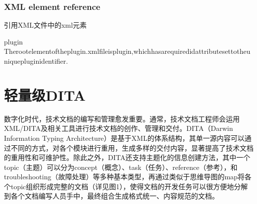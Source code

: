 \documentclass[letterpaper,10pt,english]{sphinxmanual}
\begin{document}
\subsection{XML element reference}
\label{\detokenize{dita-examples/dita-source-reading:xml-element-reference}}
\sphinxAtStartPar
引用XML文件中的xml元素

\sphinxAtStartPar
{}

\begin{sphinxVerbatim}[commandchars=\\\{\}]
plugin
Therootelementoftheplugin.xmlfileisplugin,whichhasarequiredidattributesettotheuniqueplug\PYGZhy{}inidentifier.
\end{sphinxVerbatim}

\sphinxstepscope


\chapter{轻量级DITA}
\label{\detokenize{dita/lightweight-dita:dita}}\label{\detokenize{dita/lightweight-dita::doc}}
\sphinxAtStartPar
数字化时代，技术文档的编写和管理愈发重要。通常，技术文档工程师会运用XML/DITA及相关工具进行技术文档的创作、管理和交付。DITA（Darwin Information Typing Architecture）是基于XML的体系结构，其单一源内容可以通过不同的方式，对各个模块进行重用，生成多样的交付内容，显著提高了技术文档的重用性和可维护性。除此之外，DITA还支持主题化的信息创建方法，其中一个topic（主题）可以分为concept（概念）、task（任务）、reference（参考），和troubleshooting（故障处理）等多种基本类型，再通过类似于思维导图的map将各个topic组织形成完整的文档（详见图1），使得文档的开发任务可以很方便地分解到各个文档编写人员手中，最终组合生成格式统一、内容规范的文档。

\sphinxAtStartPar
{}
\end{document}
